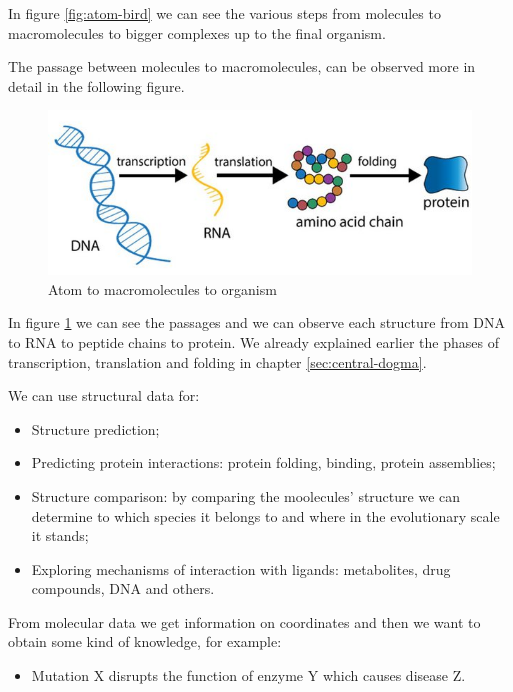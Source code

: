 In figure \ref{fig:atom-bird} we can see the various steps from molecules to macromolecules to bigger complexes up to the final organism.

The passage between molecules to macromolecules, can be observed more in detail in the following figure.
\begin{figure}[h!]
    \centering
    \includegraphics{res/proteins_overview/dna_protein.png}
    \caption{Atom to macromolecules to organism}
    \label{fig:molecule-protein}
\end{figure}

In figure \ref{fig:molecule-protein} we can see the passages and we can observe each structure from DNA to RNA to peptide chains to protein. We already explained earlier the phases of transcription, translation and folding in chapter \ref{sec:central-dogma}. 

We can use structural data for:
\begin{itemize}
    \item Structure prediction;
    \item Predicting protein interactions: protein folding, binding, protein assemblies;
    \item Structure comparison: by comparing the moolecules' structure we can determine to which species it belongs to and where in the evolutionary scale it stands;
    \item Exploring mechanisms of interaction with ligands: metabolites, drug compounds, DNA and others.
\end{itemize}

From molecular data we get information on coordinates and then we want to obtain some kind of knowledge, for example:
\begin{itemize}
    \item Mutation X disrupts the function of enzyme Y which causes disease Z.
\end{itemize}

\vspace{1em}

